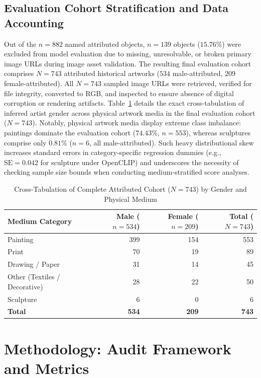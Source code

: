\documentclass[pdflatex,sn-mathphys-num]{sn-jnl}%
\theoremstyle{thmstyleone}%
\theoremstyle{thmstyletwo}%
\theoremstyle{thmstylethree}%
\begin{document}
\subsection{Evaluation Cohort Stratification and Data Accounting}
Out of the $n=882$ named attributed objects, $n=139$ objects ($15.76\%$) were excluded from model evaluation due to missing, unresolvable, or broken primary image URLs during image asset validation. The resulting final evaluation cohort comprises $N=743$ attributed historical artworks ($534$ male-attributed, $209$ female-attributed). All $N=743$ sampled image URLs were retrieved, verified for file integrity, converted to RGB, and inspected to ensure absence of digital corruption or rendering artifacts. Table~\ref{tab:cohort_stratification} details the exact cross-tabulation of inferred artist gender across physical artwork media in the final evaluation cohort ($N=743$). Notably, physical artwork media display extreme class imbalance: paintings dominate the evaluation cohort ($74.43\%$, $n=553$), whereas sculptures comprise only $0.81\%$ ($n=6$, all male-attributed). Such heavy distributional skew increases standard errors in category-specific regression dummies (e.g., $\text{SE} = 0.042$ for sculpture under OpenCLIP) and underscores the necessity of checking sample size bounds when conducting medium-stratified score analyses.

\begin{table}[h]
\caption{Cross-Tabulation of Complete Attributed Cohort ($N=743$) by Gender and Physical Medium}
\label{tab:cohort_stratification}
\centering
\small
\begin{tabular}{lrrr}
\toprule
\textbf{Medium Category} & \textbf{Male ($n=534$)} & \textbf{Female ($n=209$)} & \textbf{Total ($N=743$)} \\
\midrule
Painting & 399 & 154 & 553 \\
Print & 70 & 19 & 89 \\
Drawing / Paper & 31 & 14 & 45 \\
Other (Textiles / Decorative) & 28 & 22 & 50 \\
Sculpture & 6 & 0 & 6 \\
\midrule
\textbf{Total} & \textbf{534} & \textbf{209} & \textbf{743} \\
\bottomrule
\end{tabular}
\end{table}


\section{Methodology: Audit Framework and Metrics}
\label{sec:methodology}
\end{document}
